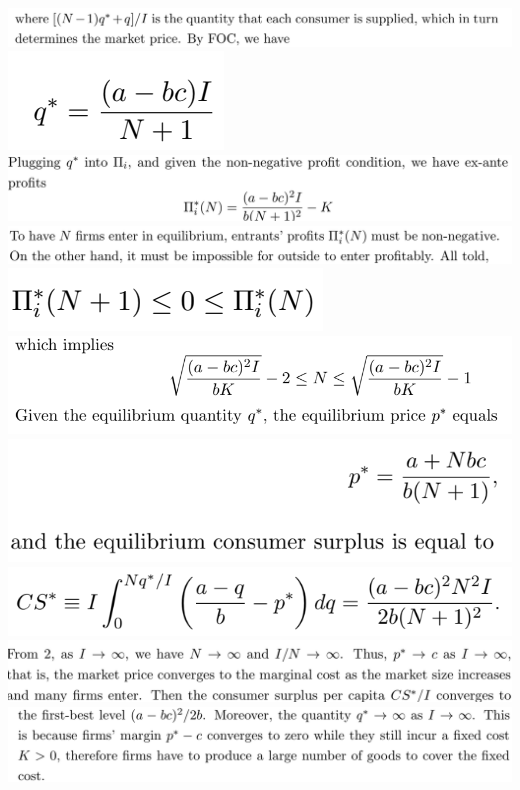 \documentclass[8pt,landscape]{extarticle}
\begin{document}
\begin{multicols*}{3}
    \includegraphics[width=0.73\linewidth,keepaspectratio]{Screenshots/Screenshot 2024-03-11 171639.png}
    \includegraphics[width=0.14\linewidth,keepaspectratio]{Screenshots/Screenshot 2024-03-11 171643.png}
    \includegraphics[width=0.7\linewidth,keepaspectratio]{Screenshots/Screenshot 2024-03-11 171651.png}
    \includegraphics[width=0.72\linewidth,keepaspectratio]{Screenshots/Screenshot 2024-03-11 171701.png}
    \includegraphics[width=0.21\linewidth,keepaspectratio]{Screenshots/Screenshot 2024-03-11 171705.png}
    \includegraphics[width=0.58\linewidth,keepaspectratio]{Screenshots/Screenshot 2024-03-11 171711.png}
    \includegraphics[width=0.42\linewidth,keepaspectratio]{Screenshots/Screenshot 2024-03-11 171715.png}
    \includegraphics[width=0.44\linewidth,keepaspectratio]{Screenshots/Screenshot 2024-03-11 171721.png}
    \includegraphics[width=0.7\linewidth,keepaspectratio]{Screenshots/Screenshot 2024-03-11 171726.png}
    \includegraphics[width=0.71\linewidth,keepaspectratio]{Screenshots/Screenshot 2024-03-11 171734.png}

\end{multicols*}
\end{document}
